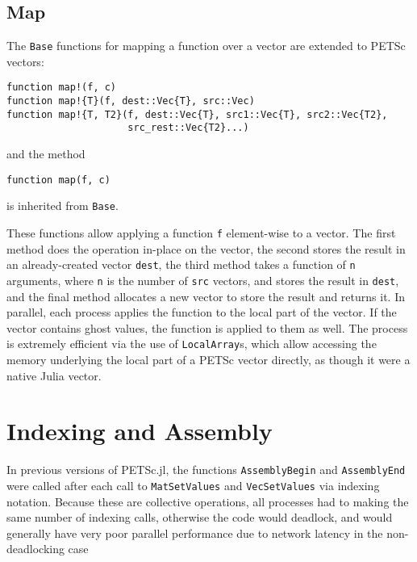 \documentclass{article}
\begin{document}
\subsection{Map}
The \texttt{Base} functions for mapping a function over a vector are extended
to PETSc vectors:

\begin{verbatim}
function map!(f, c)
function map!{T}(f, dest::Vec{T}, src::Vec)
function map!{T, T2}(f, dest::Vec{T}, src1::Vec{T}, src2::Vec{T2},  
                     src_rest::Vec{T2}...)
\end{verbatim}

\noindent and the method
\begin{verbatim}
function map(f, c)
\end{verbatim}

\noindent is inherited from \texttt{Base}.

These functions allow applying a function \texttt{f} element-wise to a vector.
The first method does the operation in-place on the vector, the second stores
the result in an already-created vector \texttt{dest}, the third method 
takes a function of \texttt{n} arguments, where \texttt{n} is the number of
\texttt{src} vectors, and stores the result in \texttt{dest}, and the final 
method allocates a new vector to store the result and returns it.
In parallel, each process applies the function to the local part of the vector.
If the vector contains ghost values, the function is applied to them as well.
The process is extremely efficient via the use of \texttt{LocalArray}s, which
allow accessing the memory underlying the local part of a PETSc vector directly,
as though it were a native Julia vector.

\section{Indexing and Assembly}
In previous versions of PETSc.jl, the functions \texttt{AssemblyBegin} and 
\texttt{AssemblyEnd} were called after each call to \texttt{MatSetValues} and
\texttt{VecSetValues} via indexing notation.  Because these are collective 
operations, all processes had to making the same number of indexing calls, 
otherwise the code would deadlock, and would generally have very poor parallel
performance due to network latency in the non-deadlocking case
\end{document}

